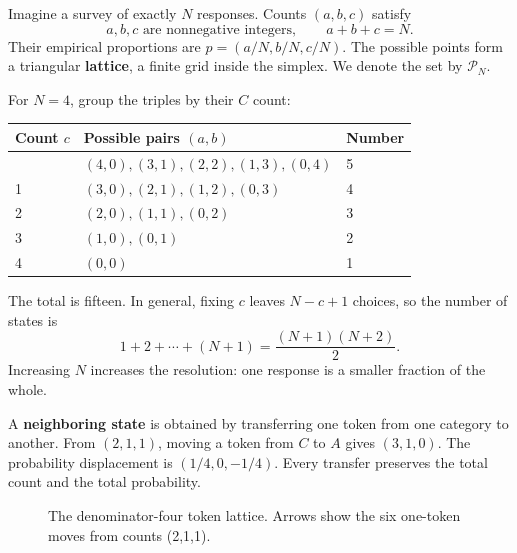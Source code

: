 \documentclass[11pt,oneside,openany]{book}
\theoremstyle{definition}
\theoremstyle{remark}
\numberwithin{equation}{chapter}
\begin{document}
Imagine a survey of exactly \(N\) responses. Counts \((a,b,c)\) satisfy \[a,b,c\text{ are nonnegative integers},\qquad a+b+c=N.\] Their empirical proportions are \(p=(a/N,b/N,c/N)\). The possible points form a triangular \textbf{lattice}, a finite grid inside the simplex. We denote the set by \(\mathcal P_N\).

For \(N=4\), group the triples by their \(C\) count:

\begin{longtable}[]{@{}lll@{}}
\toprule\noalign{}
Count \(c\) & Possible pairs \((a,b)\) & Number \\
\midrule\noalign{}
\endhead
\bottomrule\noalign{}
\endlastfoot
0 & \((4,0),(3,1),(2,2),(1,3),(0,4)\) & 5 \\
1 & \((3,0),(2,1),(1,2),(0,3)\) & 4 \\
2 & \((2,0),(1,1),(0,2)\) & 3 \\
3 & \((1,0),(0,1)\) & 2 \\
4 & \((0,0)\) & 1 \\
\end{longtable}

The total is fifteen. In general, fixing \(c\) leaves \(N-c+1\) choices, so the number of states is \[1+2+\cdots+(N+1)=\frac{(N+1)(N+2)}2.\] Increasing \(N\) increases the resolution: one response is a smaller fraction of the whole.

A \textbf{neighboring state} is obtained by transferring one token from one category to another. From \((2,1,1)\), moving a token from \(C\) to \(A\) gives \((3,1,0)\). The probability displacement is \((1/4,0,-1/4)\). Every transfer preserves the total count and the total probability.

\begin{figure}[htbp]\centering
{}
\caption{The denominator-four token lattice. Arrows show the six one-token moves from counts (2,1,1).}\end{figure}
\end{document}
